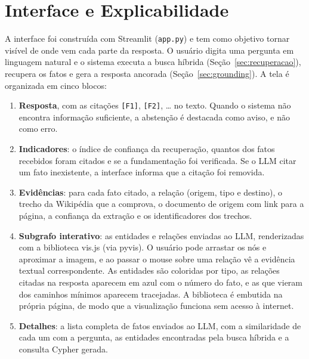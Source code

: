 %

\section{Interface e Explicabilidade}
\label{sec:interface}

A interface foi construída com Streamlit (\texttt{app.py}) e tem como objetivo tornar visível de onde vem cada parte da resposta. O usuário digita uma pergunta em linguagem natural e o sistema executa a busca híbrida (Seção~\ref{sec:recuperacao}), recupera os fatos e gera a resposta ancorada (Seção~\ref{sec:grounding}). A tela é organizada em cinco blocos:

\begin{enumerate}
  \item \textbf{Resposta}, com as citações \texttt{[F1]}, \texttt{[F2]}, \ldots{} no texto. Quando o sistema não encontra informação suficiente, a abstenção é destacada como aviso, e não como erro.
  \item \textbf{Indicadores}: o índice de confiança da recuperação, quantos dos fatos recebidos foram citados e se a fundamentação foi verificada. Se o LLM citar um fato inexistente, a interface informa que a citação foi removida.
  \item \textbf{Evidências}: para cada fato citado, a relação (origem, tipo e destino), o trecho da Wikipédia que a comprova, o documento de origem com link para a página, a confiança da extração e os identificadores dos trechos.
  \item \textbf{Subgrafo interativo}: as entidades e relações enviadas ao LLM, renderizadas com a biblioteca vis.js (via pyvis). O usuário pode arrastar os nós e aproximar a imagem, e ao passar o mouse sobre uma relação vê a evidência textual correspondente. As entidades são coloridas por tipo, as relações citadas na resposta aparecem em azul com o número do fato, e as que vieram dos caminhos mínimos aparecem tracejadas. A biblioteca é embutida na própria página, de modo que a visualização funciona sem acesso à internet.
  \item \textbf{Detalhes}: a lista completa de fatos enviados ao LLM, com a similaridade de cada um com a pergunta, as entidades encontradas pela busca híbrida e a consulta Cypher gerada.
\end{enumerate}

